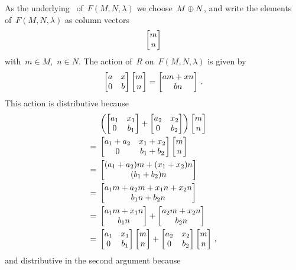 As the underlying~{} of~$F(M,N,\lambda)$ we choose~$M \oplus N$, and write the elements of~$F(M,N,\lambda)$ as column vectors
\[
  \begin{bmatrix} m \\ n \end{bmatrix}
\]
with~$m \in M$,~$n \in N$.
The action of~$R$ on~$F(M,N,\lambda)$ is given by
\[
    \begin{bmatrix}
      a & x \\
      0 & b
    \end{bmatrix}
    \begin{bmatrix} m \\ n \end{bmatrix}
  = \begin{bmatrix}  am + xn \\ bn  \end{bmatrix} \,.
\]
This action is distributive because
\begin{align*}
  {}&
  \left(
    \begin{bmatrix}
      a_1 & x_1 \\
      0   & b_1
    \end{bmatrix}
    +
    \begin{bmatrix}
      a_2 & x_2 \\
      0   & b_2
    \end{bmatrix}
  \right)
  \begin{bmatrix} m \\ n \end{bmatrix}
  \\
  ={}&
  \begin{bmatrix}
    a_1 + a_2 & x_1 + x_2 \\
    0         & b_1 + b_2
  \end{bmatrix}
  \begin{bmatrix} m \\ n \end{bmatrix}
  \\
  ={}&
  \begin{bmatrix}  (a_1 + a_2) m + (x_1 + x_2) n \\ (b_1 + b_2) n   \end{bmatrix}
  \\
  ={}&
  \begin{bmatrix}  a_1 m + a_2 m + x_1 n + x_2 n \\ b_1 n + b_2 n  \end{bmatrix}
  \\
  ={}&
    \begin{bmatrix}  a_1 m + x_1 n \\ b_1 n  \end{bmatrix}
  + \begin{bmatrix}  a_2 m + x_2 n \\ b_2 n  \end{bmatrix}
  \\
  ={}&
  \begin{bmatrix}
    a_1 & x_1 \\
    0   & b_1
  \end{bmatrix}
  \begin{bmatrix} m \\ n \end{bmatrix}
  +
  \begin{bmatrix}
    a_2 & x_2 \\
    0   & b_2
  \end{bmatrix}
  \begin{bmatrix} m \\ n \end{bmatrix} \,,
\end{align*}
and distributive in the second argument because
